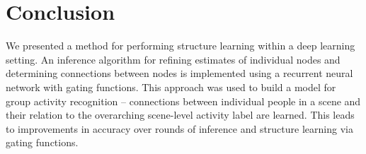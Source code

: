 \documentclass[10pt,twocolumn,letterpaper]{article}
\begin{document}
\vspace{-2mm}
\section{Conclusion}
\vspace{-1mm}

We presented a method for performing structure learning within a deep learning setting.  An inference algorithm for refining estimates of individual nodes and determining connections between nodes is implemented using a recurrent neural network with gating functions.  This approach was used to build a model for group activity recognition -- connections between individual people in a scene and their relation to the overarching scene-level activity label are learned.  This leads to improvements in accuracy over rounds of inference and structure learning via gating functions.

{\small


}
\end{document}
